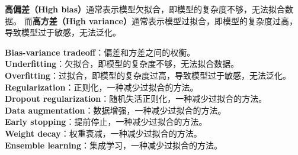 \textbf{高偏差（High bias）}通常表示模型欠拟合，即模型的复杂度不够，无法拟合数据。
而\textbf{高方差（High variance）}通常表示模型过拟合，即模型的复杂度过高，导致模型过于敏感，无法泛化。


\textbf{Bias-variance tradeoff}：偏差和方差之间的权衡。\\
\textbf{Underfitting}：欠拟合，即模型的复杂度不够，无法拟合数据。\\
\textbf{Overfitting}：过拟合，即模型的复杂度过高，导致模型过于敏感，无法泛化。\\
\textbf{Regularization}：正则化，一种减少过拟合的方法。\\
\textbf{Dropout regularization}：随机失活正则化，一种减少过拟合的方法。\\
\textbf{Data augmentation}：数据增强，一种减少过拟合的方法。\\
\textbf{Early stopping}：提前停止，一种减少过拟合的方法。\\
\textbf{Weight decay}：权重衰减，一种减少过拟合的方法。\\
\textbf{Ensemble learning}：集成学习，一种减少过拟合的方法。
